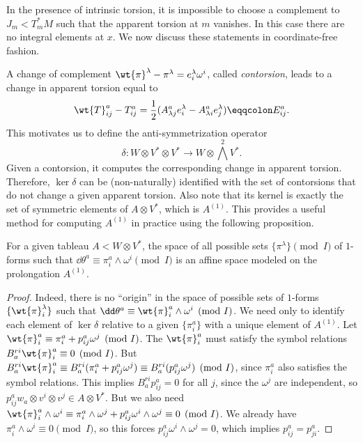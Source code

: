 In the presence of intrinsic torsion, it is impossible to choose a complement to $J_m<T^\ast_mM$ such that the apparent torsion at $m$ vanishes. In this case there are no integral elements at $x$. We now discuss these statements in coordinate-free fashion.

A change of complement $\wt{\pi}^\lambda-\pi^\lambda=e^\lambda_i \omega^i$, called \emph{contorsion}, leads to a change in apparent torsion equal to
\[\wt{T}^a_{ij}-T^a_{ij}=\frac12(A^a_{\lambda j}e^\lambda_i-A^a_{\lambda i}e^\lambda_j)\eqqcolon E^a_{ij}.\]
This motivates us to define the anti-symmetrization operator
\[\delta:W\otimes V^\ast\otimes V^\ast\to W\otimes \bigwedge^2V^\ast.\]
Given a contorsion, it computes the corresponding change in apparent torsion. Therefore, $\ker\delta$ can be (non-naturally) identified with the set of contorsions that do not change a given apparent torsion. Also note that its kernel is exactly the set of symmetric elements of $A\otimes V^\ast$, which is $A^{(1)}$. This provides a useful method for computing $A^{(1)}$ in practice using the following proposition.

\begin{prop}\label{prop 6.7.1 Ivey}
    For a given tableau $A<W\otimes V^\ast$, the space of all possible sets $\{\pi^\lambda\}\pmod{I}$ of $1$-forms such that $\dd\theta^a\equiv \pi^a_i\wedge\omega^i\pmod{I}$ is an affine space modeled on the prolongation $A^{(1)}$.
\end{prop}
\begin{proof}
    Indeed, there is no ``origin'' in the space of possible sets of $1$-forms $\{\wt{\pi}_i^\lambda\}$ such that $\dd\theta^a\equiv\wt{\pi}^a_i\wedge \omega^i\pmod{I}$. We need only to identify each element of $\ker\delta$ relative to a given $\{\pi^a_i\}$ with a unique element of $A^{(1)}$. Let $\wt{\pi}^a_i\equiv\pi^a_i+p^a_{ij}\omega^j \pmod{I}$. The $\wt{\pi}^a_i$ must satisfy the symbol relations $B^{ri}_a\wt{\pi}^a_i\equiv 0\pmod{I}$. But $B^{ri}_a \wt{\pi}^a_i\equiv B^{ri}_a(\pi^a_i+p^a_{ij}\omega^j)\equiv B^{ri}_a(p^a_{ij}\omega^j)\pmod{I}$, since $\pi^a_i$ also satisfies the symbol relations. This implies $B^{ri}_ap^a_{ij}=0$ for all $j$, since the $\omega^j$ are independent, so $p^a_{ij}w_a\otimes v^i\otimes v^j\in A\otimes V^\ast$. But we also need $\wt{\pi}^a_i\wedge \omega^i\equiv \pi^a_i\wedge\omega^j+p^a_{ij}\omega^i\wedge\omega^j\equiv 0\pmod{I}$. We already have $\pi^a_i\wedge \omega^i\equiv 0\pmod{I}$, so this forces $p^a_{ij}\omega^i\wedge \omega^j=0$, which implies $p^a_{ij}=p^a_{ji}$.
\end{proof}

